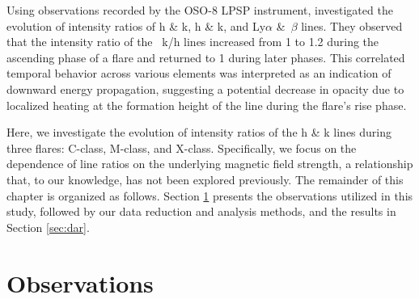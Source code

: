 Using observations recorded by the OSO-8 LPSP instrument, \citep{lemaire84} investigated the evolution of intensity ratios of   h \& k,  h \& k, and Ly$\alpha$ \&~$\beta$ lines. They observed that the intensity ratio of the ~k/h lines increased from 1 to 1.2 during the ascending phase of a flare and returned to 1 during later phases. This correlated temporal behavior across various elements was interpreted as an indication of downward energy propagation, suggesting a potential decrease in opacity due to localized heating at the formation height of the  line during the flare's rise phase.

Here, we investigate the evolution of intensity ratios of the   h \& k lines during three flares: C-class, M-class, and X-class. Specifically, we focus on the dependence of line ratios on the underlying magnetic field strength, a relationship that, to our knowledge, has not been explored previously. The remainder of this chapter is organized as follows. Section \ref{sec:obs} presents the observations utilized in this study, followed by our data reduction and analysis methods, and the results in Section \ref{sec:dar}.

\section{Observations} \label{sec:obs}
\begin{table}[ht!]
\centering
{}
\caption{List of flares studied in this chapter.}
\label{tab:my_label}
\end{table}

